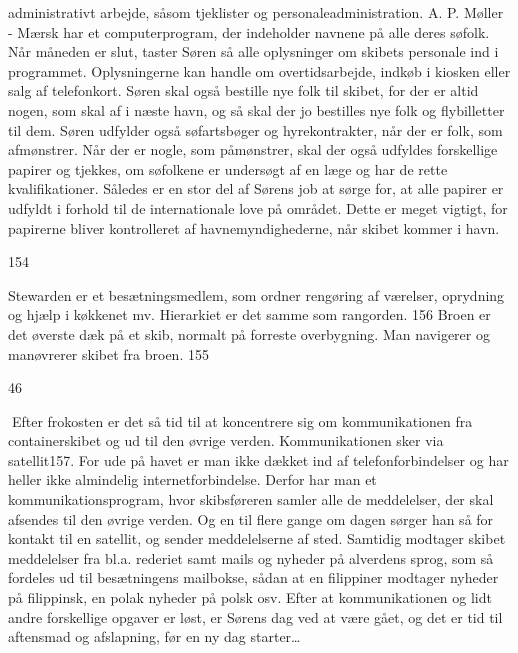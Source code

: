 administrativt arbejde, såsom tjeklister og personaleadministration. A.
P. Møller - Mærsk har et computerprogram, der indeholder navnene på alle
deres søfolk. Når måneden er slut, taster Søren så alle oplysninger om
skibets personale ind i programmet. Oplysningerne kan handle om
overtidsarbejde, indkøb i kiosken eller salg af telefonkort. Søren skal
også bestille nye folk til skibet, for der er altid nogen, som skal af i
næste havn, og så skal der jo bestilles nye folk og flybilletter til
dem. Søren udfylder også søfartsbøger og hyrekontrakter, når der er
folk, som afmønstrer. Når der er nogle, som påmønstrer, skal der også
udfyldes forskellige papirer og tjekkes, om søfolkene er undersøgt af en
læge og har de rette kvalifikationer. Således er en stor del af Sørens
job at sørge for, at alle papirer er udfyldt i forhold til de
internationale love på området. Dette er meget vigtigt, for papirerne
bliver kontrolleret af havnemyndighederne, når skibet kommer i havn.

154

Stewarden er et besætningsmedlem, som ordner rengøring af værelser,
oprydning og hjælp i køkkenet mv. Hierarkiet er det samme som rangorden.
156 Broen er det øverste dæk på et skib, normalt på forreste
overbygning. Man navigerer og manøvrerer skibet fra broen. 155

46

Efter frokosten er det så tid til at koncentrere sig om kommunikationen
fra containerskibet og ud til den øvrige verden. Kommunikationen sker
via satellit157. For ude på havet er man ikke dækket ind af
telefonforbindelser og har heller ikke almindelig internetforbindelse.
Derfor har man et kommunikationsprogram, hvor skibsføreren samler alle
de meddelelser, der skal afsendes til den øvrige verden. Og en til flere
gange om dagen sørger han så for kontakt til en satellit, og sender
meddelelserne af sted. Samtidig modtager skibet meddelelser fra bl.a.
rederiet samt mails og nyheder på alverdens sprog, som så fordeles ud
til besætningens mailbokse, sådan at en filippiner modtager nyheder på
filippinsk, en polak nyheder på polsk osv. Efter at kommunikationen og
lidt andre forskellige opgaver er løst, er Sørens dag ved at være gået,
og det er tid til aftensmad og afslapning, før en ny dag starter\ldots{}
